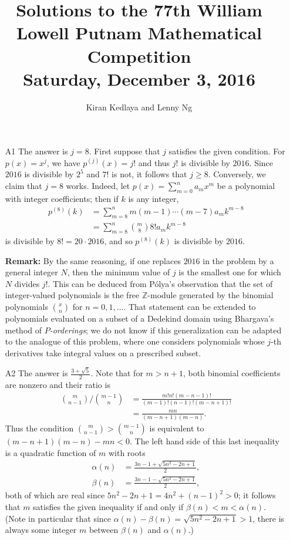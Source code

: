 \documentclass[amssymb,twocolumn,pra,10pt,aps]{revtex4-1}
\newcommand{\ZZ}{\mathbb{Z}}
\begin{document}
\title{Solutions to the 77th William Lowell Putnam Mathematical Competition \\
    Saturday, December 3, 2016}
\author{Kiran Kedlaya and Lenny Ng}
\noaffiliation
\maketitle

\begin{itemize}
\item[A1]
The answer is $j=8$. First suppose that $j$ satisfies the given condition. For $p(x) = x^j$, we have $p^{(j)}(x) = j!$ and thus $j!$ is divisible by $2016$. Since $2016$ is divisible by $2^5$ and $7!$ is not, it follows that $j \geq 8$. Conversely, we claim that $j=8$ works. Indeed, let $p(x) = \sum_{m=0}^n a_m x^m$ be a polynomial with integer coefficients; then if $k$ is any integer, 
\begin{align*}
p^{(8)}(k) &= \sum_{m=8}^n m(m-1)\cdots (m-7) a_m k^{m-8} \\
&= \sum_{m=8}^n {m\choose 8} 8! a_m k^{m-8}
\end{align*}
is divisible by $8! = 20 \cdot 2016$, and so $p^{(8)}(k)$ is divisible by $2016$.

\noindent
\textbf{Remark:}
By the same reasoning, if one replaces $2016$ in the problem by a general integer $N$,
then the minimum value of $j$ is the smallest one for which $N$ divides $j!$.
This can be deduced from P\'olya's observation that the set of integer-valued polynomials is the free $\ZZ$-module generated by the binomial polynomials $\binom{x}{n}$ for $n=0,1,\dots$. That statement can be extended to polynomials evaluated on a subset of a Dedekind domain using Bhargava's method of \emph{$P$-orderings}; we do not know if this generalization can be adapted to the analogue of this problem, where one considers polynomials whose $j$-th derivatives take integral values on a prescribed subset.

\item[A2]
The answer is $\frac{3+\sqrt{5}}{2}$. Note that for $m > n+1$, both binomial coefficients are nonzero and their ratio is
\begin{align*}
{m\choose n-1}/{m-1\choose n} &= \frac{m!n!(m-n-1)!}{(m-1)!(n-1)!(m-n+1)!} \\
&= \frac{mn}{(m-n+1)(m-n)}.
\end{align*}
Thus the condition ${m\choose{n-1}} > {{m-1}\choose n}$ is equivalent to $(m-n+1)(m-n)-mn < 0$. The left hand side of this last inequality is a quadratic function of $m$ with roots
\begin{align*}
\alpha(n) &= \frac{3n-1+\sqrt{5n^2-2n+1}}{2}, \\
\beta(n) &= \frac{3n-1-\sqrt{5n^2-2n+1}}{2},
\end{align*}
both of which are real since $5n^2-2n+1 = 4n^2+(n-1)^2 > 0$; it follows that $m$ satisfies the given inequality if and only if $\beta(n) < m < \alpha(n)$. (Note in particular that since $\alpha(n)-\beta(n) = \sqrt{5n^2-2n+1} > 1$, there is always some integer $m$ between $\beta(n)$ and $\alpha(n)$.)



\end{itemize}
\end{document}

